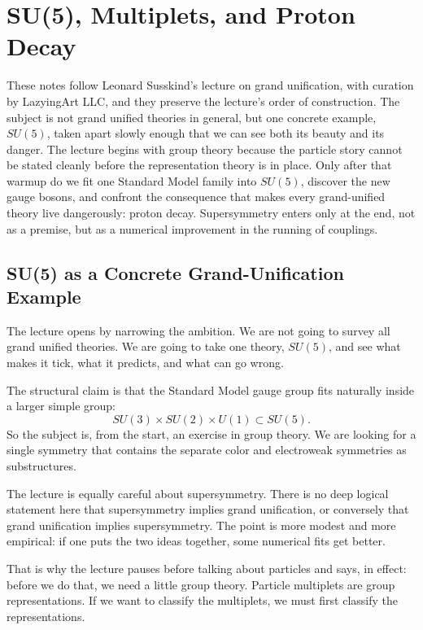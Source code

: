 \chapter{SU(5), Multiplets, and Proton Decay}

These notes follow Leonard Susskind's lecture on grand unification, with curation by LazyingArt LLC, and they preserve the lecture's order of construction. The subject is not grand unified theories in general, but one concrete example, \(SU(5)\), taken apart slowly enough that we can see both its beauty and its danger. The lecture begins with group theory because the particle story cannot be stated cleanly before the representation theory is in place. Only after that warmup do we fit one Standard Model family into \(SU(5)\), discover the new gauge bosons, and confront the consequence that makes every grand-unified theory live dangerously: proton decay. Supersymmetry enters only at the end, not as a premise, but as a numerical improvement in the running of couplings.

\section{SU(5) as a Concrete Grand-Unification Example}

The lecture opens by narrowing the ambition. We are not going to survey all grand unified theories. We are going to take one theory, \(SU(5)\), and see what makes it tick, what it predicts, and what can go wrong.

The structural claim is that the Standard Model gauge group fits naturally inside a larger simple group:
\begin{equation}
SU(3)\times SU(2)\times U(1)\subset SU(5).
\end{equation}
So the subject is, from the start, an exercise in group theory. We are looking for a single symmetry that contains the separate color and electroweak symmetries as substructures.

The lecture is equally careful about supersymmetry. There is no deep logical statement here that supersymmetry implies grand unification, or conversely that grand unification implies supersymmetry. The point is more modest and more empirical: if one puts the two ideas together, some numerical fits get better.

That is why the lecture pauses before talking about particles and says, in effect: before we do that, we need a little group theory. Particle multiplets are group representations. If we want to classify the multiplets, we must first classify the representations.

